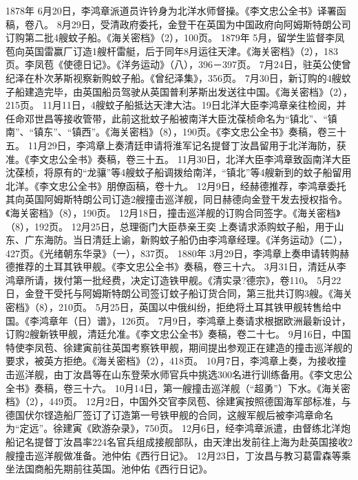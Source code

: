\documentclass[12pt,UTF8]{ctexbook}
\begin{document}
1878年
6月20日，李鸿章派道员许钤身为北洋水师督操。《李文忠公全书》译署函稿，卷八。
8月29日，受清政府委托，金登干在英国为中国政府向阿姆斯特朗公司订购第二批4艘蚊子船。《海关密档》（2），100页。
1879年
5月，留学生监督李凤苞向英国雷赢厂订造1艘杆雷艇，后于同年8月运往天津。《海关密档》（2），183页。李凤苞《使德日记》。《洋务运动》（八），396－397页。
7月24日，驻英公使曾纪泽在朴次茅斯视察新购蚊子船。《曾纪泽集》，356页。
7月30日，新订购的4艘蚊子船建造完毕，由英国船员驾驶从英国普利茅斯出发送往中国。《海关密档》（2），215页。
11月11日，4艘蚊子船抵达天津大沽。19日北洋大臣李鸿章亲往检阅，并任命邓世昌等接收管带，此前这批蚊子船被南洋大臣沈葆桢命名为“镇北”、“镇南”、“镇东”、“镇西”。《海关密档》（8），190页。《李文忠公全书》奏稿，卷三十五。
11月29日，李鸿章上奏清廷申请将淮军记名提督丁汝昌留用于北洋海防，获准。《李文忠公全书》奏稿，卷三十五。
11月30日，北洋大臣李鸿章致函南洋大臣沈葆桢，将原有的“龙骧”等4艘蚊子船调拨给南洋，“镇北”等4艘新到的蚊子船留用北洋。《李文忠公全书》朋僚函稿，卷十九。
12月9日，经赫德推荐，李鸿章委托其向英国阿姆斯特朗公司订造2艘撞击巡洋舰，同日赫德向金登干发去授权指令。《海关密档》（8），190页。
12月18日，撞击巡洋舰的订购合同签字。《海关密档》（8），192页。
12月25日，总理衙门大臣恭亲王奕上奏请求添购蚊子船，用于山东、广东海防。当日清廷上谕，新购蚊子船仍由李鸿章经理。《洋务运动》（二），427页。《光绪朝东华录》（一），837页。
1880年
3月29日，李鸿章上奏申请转购赫德推荐的土耳其铁甲舰。《李文忠公全书》奏稿，卷三十六。
3月31日，清廷从李鸿章所请，拨付第一批经费，决定订造铁甲舰。《清实录?德宗》，卷110。
5月22日，金登干受托与阿姆斯特朗公司签订蚊子船订货合同，第三批共订购3艘。《海关密档》（8），210页。
5月25日，英国以中俄纠纷，拒绝将土耳其铁甲舰转售给中国。《李鸿章年（日）谱》，126页。
7月9日，李鸿章上奏请求根据欧洲最新设计，订购2艘新铁甲舰，清廷允准。《李文忠公全书》奏稿，卷二十七。
9月16日，中国特使李凤苞、徐建寅前往英国考察铁甲舰，期间提出参观正在建造的撞击巡洋舰的要求，被英方拒绝。《海关密档》（2），418页。
10月7日，李鸿章上奏，为接收撞击巡洋舰，由丁汝昌等在山东登荣水师官兵中挑选300名进行训练备用。《李文忠公全书》奏稿，卷三十六。
10月14日，第一艘撞击巡洋舰（“超勇”）下水。《海关密档》（2），449页。
12月2日，中国外交官李凤苞、徐建寅按照德国海军部标准，与德国伏尔铿造船厂签订了订造第一号铁甲舰的合同，这艘军舰后被李鸿章命名为“定远”。徐建寅《欧游杂录》，750页。
12月6日，经李鸿章派遣，由督练北洋炮船记名提督丁汝昌率224名官兵组成接舰部队，由天津出发前往上海为赴英国接收2艘撞击巡洋舰做准备。池仲佑《西行日记》。
12月23日，丁汝昌与教习葛雷森等乘坐法国商船先期前往英国。池仲佑《西行日记》。
\end{document}
